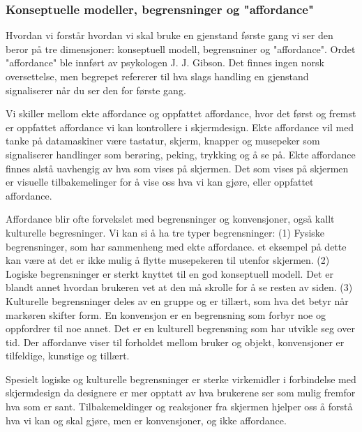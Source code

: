 \noindent
\subsubsection{Konseptuelle modeller, begrensninger og "affordance"}

\noindent
Hvordan vi forstår hvordan vi skal bruke en gjenstand første gang vi ser den beror på tre dimensjoner: konseptuell modell, begrensniner og "affordance". Ordet "affordance" ble innført av psykologen J. J. Gibson. Det finnes ingen norsk oversettelse, men begrepet refererer til hva slags handling en gjenstand signaliserer når du ser den for første gang.\cite{Norman99}

\noindent
Vi skiller mellom ekte affordance og oppfattet affordance, hvor det først og fremst er oppfattet affordance vi kan kontrollere i skjermdesign. Ekte affordance vil med tanke på datamaskiner være tastatur, skjerm, knapper og musepeker som signaliserer handlinger som berøring, peking, trykking og å se på. Ekte affordance finnes alstå uavhengig av hva som vises på skjermen. Det som vises på skjermen er visuelle tilbakemelinger for å vise oss hva vi kan gjøre, eller oppfattet affordance.\cite{Norman99}

\noindent
Affordance blir ofte forvekslet med begrensninger og konvensjoner, også kallt kulturelle begresninger. Vi kan si å ha tre typer begrensninger: (1) Fysiske begrensninger, som har sammenheng med ekte affordance. et eksempel på dette kan være at det er ikke mulig å flytte musepekeren til utenfor skjermen. (2) Logiske begrensninger er sterkt knyttet til en god konseptuell modell. Det er blandt annet hvordan brukeren vet at den må skrolle for å se resten av siden. (3) Kulturelle begrensninger deles av en gruppe og er tillært, som hva det betyr når markøren skifter form. En konvensjon er en begrensning som forbyr noe og oppfordrer til noe annet. Det er en kulturell begrensning som har utvikle seg over tid. Der affordanve viser til forholdet mellom bruker og objekt, konvensjoner er tilfeldige, kunstige og tillært.\cite{Norman99}

\noindent
Spesielt logiske og kulturelle begrensninger er sterke virkemidler i forbindelse med skjermdesign da designere er mer opptatt av hva brukerene ser som mulig fremfor hva som er sant. Tilbakemeldinger og reaksjoner fra skjermen hjelper oss å forstå hva vi kan og skal gjøre, men er konvensjoner, og ikke affordance.\cite{Norman99}